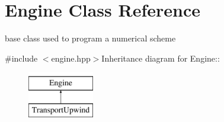 \hypertarget{classEngine}{
\section{Engine Class Reference}
\label{classEngine}
}


base class used to program a numerical scheme  


{\ttfamily \#include $<$engine.hpp$>$}Inheritance diagram for Engine::\begin{figure}[H]
\begin{center}
\leavevmode
\includegraphics[height=2cm]{classEngine}
\end{center}
\end{figure}
